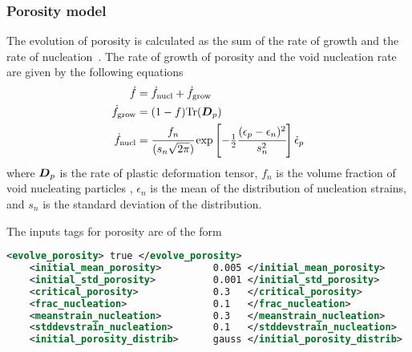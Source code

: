   \subsubsection{Porosity model}
  The evolution of porosity is calculated as the sum of the rate of growth
  and the rate of nucleation~\cite{Ramaswamy1998a}.  The rate of growth of
  porosity and the void nucleation rate are given by the following equations
  ~\cite{Chu1980}
  \begin{align}
    \dot{f} &= \dot{f}_{\text{nucl}} + \dot{f}_{\text{grow}} \\
    \dot{f}_{\text{grow}} & = (1-f) \text{Tr}(\boldsymbol{D}_p) \\
    \dot{f}_{\text{nucl}} & = \cfrac{f_n}{(s_n \sqrt{2\pi})}
            \exp\left[-\tfrac{1}{2} \cfrac{(\epsilon_p - \epsilon_n)^2}{s_n^2}\right]
            \dot{\epsilon}_p
  \end{align}
  where $\boldsymbol{D}_p$ is the rate of plastic deformation tensor, $f_n$ is the volume
  fraction of void nucleating particles , $\epsilon_n$ is the mean of the
  distribution of nucleation strains, and $s_n$ is the standard
  deviation of the distribution.

  The inputs tags for porosity are of the form
  \begin{lstlisting}[language=XML]
    <evolve_porosity> true </evolve_porosity>
    <initial_mean_porosity>         0.005 </initial_mean_porosity>
    <initial_std_porosity>          0.001 </initial_std_porosity>
    <critical_porosity>             0.3   </critical_porosity>
    <frac_nucleation>               0.1   </frac_nucleation>
    <meanstrain_nucleation>         0.3   </meanstrain_nucleation>
    <stddevstrain_nucleation>       0.1   </stddevstrain_nucleation>
    <initial_porosity_distrib>      gauss </initial_porosity_distrib>
  \end{lstlisting}


